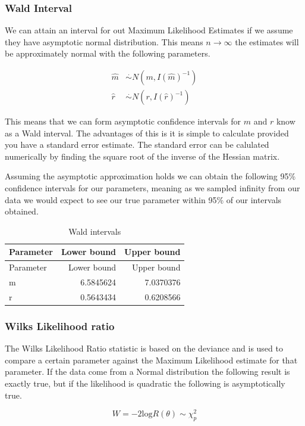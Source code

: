 \documentclass[11pt,preprint, authoryear]{elsarticle}
\numberwithin{equation}{section}
\numberwithin{figure}{section}
\numberwithin{table}{section}
\begin{document}
\subsubsection{\texorpdfstring{Wald Interval
\label{WaldyBoi}}{Wald Interval }}\label{wald-interval}

We can attain an interval for out Maximum Likelihood Estimates if we
assume they have asymptotic normal distribution. This means
\(n\to\infty\) the estimates will be approximately normal with the
following parameters.

\begin{align*}
\hat{m} & \stackrel{.}{\sim} N(m,I(\hat{m})^{-1}) \\
\hat{r} & \stackrel{.}{\sim} N(r,I(\hat{r})^{-1})
\end{align*}

This means that we can form asymptotic confidence intervals for \(m\)
and \(r\) know as a Wald interval. The advantages of this is it is
simple to calculate provided you have a standard error estimate. The
standard error can be calulated numerically by finding the square root
of the inverse of the Hessian matrix.

Assuming the asymptotic approximation holds we can obtain the following
95\% confidence intervals for our parameters, meaning as we sampled
infinity from our data we would expect to see our true parameter within
95\% of our intervals obtained.

\begin{longtable}[]{@{}lrr@{}}
\caption{Wald intervals}\tabularnewline
\toprule
Parameter & Lower bound & Upper bound\tabularnewline
\midrule
\endfirsthead
\toprule
Parameter & Lower bound & Upper bound\tabularnewline
\midrule
\endhead
m & 6.5845624 & 7.0370376\tabularnewline
r & 0.5643434 & 0.6208566\tabularnewline
\bottomrule
\end{longtable}

\subsubsection{Wilks Likelihood ratio}\label{wilks-likelihood-ratio}

The Wilks Likelihood Ratio statistic is based on the deviance and is
used to compare a certain parameter against the Maximum Likelihood
estimate for that parameter. If the data come from a Normal distribution
the following result is exactly true, but if the likelihood is quadratic
the following is asymptotically true.

\[W = -2\text{log}R(\theta) \sim \chi^2_p\]
\end{document}
